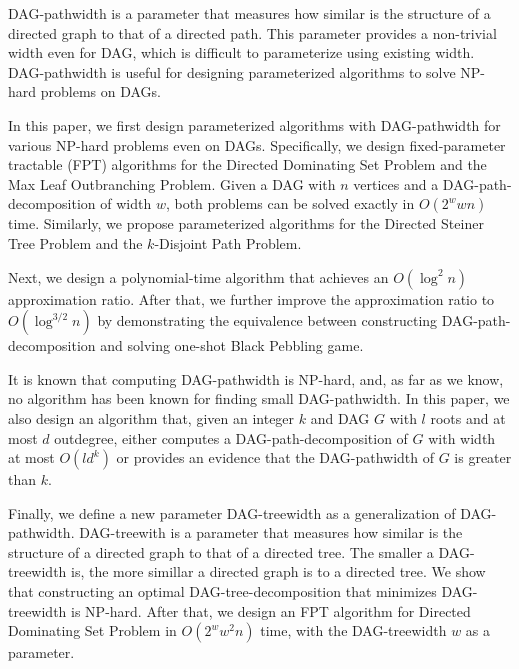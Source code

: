 \documentclass[master]{kuisthesis}		%
\theoremstyle{plain}
\theoremstyle{definition}
\begin{document}
\begin{eabstract}				%

DAG-pathwidth is a parameter that measures how similar is the structure of a directed graph to that of a directed path. This parameter provides a non-trivial width even for DAG, which is difficult to parameterize using existing width. DAG-pathwidth is useful for designing parameterized algorithms to solve NP-hard problems on DAGs.

In this paper, we first design parameterized algorithms with DAG-pathwidth for various NP-hard problems even on DAGs. Specifically, we design fixed-parameter tractable (FPT) algorithms for the Directed Dominating Set Problem and the Max Leaf Outbranching Problem. Given a DAG with $n$ vertices and a DAG-path-decomposition of width $w$, both problems can be solved exactly in $O(2^w w n)$ time. Similarly, we propose parameterized algorithms for the Directed Steiner Tree Problem and the $k$-Disjoint Path Problem. 


Next, we design a polynomial-time algorithm that achieves an $O(\log^2 n)$ approximation ratio. After that, we further improve the approximation ratio to $O(\log^{3/2} n)$ by demonstrating the equivalence between constructing DAG-path-decomposition and solving one-shot Black Pebbling game. 

It is known that computing DAG-pathwidth is NP-hard, and, as far as we know, no algorithm has been known for finding small DAG-pathwidth. In this paper, we also design an algorithm that, given an integer $k$ and DAG $G$ with $l$ roots and at most $d$ outdegree, either computes a DAG-path-decomposition of $G$ with width at most $O(l d^k)$ or provides an evidence that the DAG-pathwidth of $G$ is greater than $k$.

Finally, we define a new parameter DAG-treewidth as a generalization of DAG-pathwidth. DAG-treewith is a parameter that measures how similar is the structure of a directed graph to that of a directed tree. The smaller a DAG-treewidth is, the more simillar a directed graph is to a directed tree. We show that constructing an optimal DAG-tree-decomposition that minimizes DAG-treewidth is NP-hard. After that, we design an FPT algorithm for Directed Dominating Set Problem in $O(2^w w^2 n)$ time, with the DAG-treewidth $w$ as a parameter.

\end{eabstract}
\end{document}
